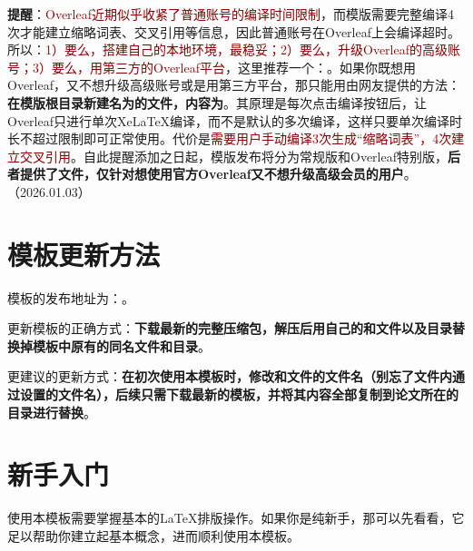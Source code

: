 \documentclass[doctor, vlined, ]{DissertUESTC}
\begin{document}
	\textbf{提醒}：\textcolor{DarkRed}{Overleaf近期似乎收紧了普通账号的编译时间限制}，而模版需要完整编译4次才能建立缩略词表、交叉引用等信息，因此普通账号在Overleaf上会编译超时。所以：\textcolor{DarkRed}{1）要么，搭建自己的本地环境，最稳妥；2）要么，升级Overleaf的高级账号；3）要么，用第三方的Overleaf平台}，这里推荐一个：\href{https://www.onlinelatex.com/home/}{\color{DarkRed}}。如果你既想用Overleaf，又不想升级高级账号或是用第三方平台，那只能用由网友\href{https://github.com/note286}{\color{DarkRed}}提供的方法：\textbf{\color{DarkRed}在模版根目录新建名为的文件，内容为}。其原理是每次点击编译按钮后，让Overleaf只进行单次XeLaTeX编译，而不是默认的多次编译，这样只要单次编译时长不超过限制即可正常使用。代价是\textcolor{DarkRed}{需要用户手动编译3次生成“缩略词表”，4次建立交叉引用}。自此提醒添加之日起，模版发布将分为常规版和Overleaf特别版，\textbf{后者提供了文件，仅针对想使用官方Overleaf又不想升级高级会员的用户}。（2026.01.03）


	\section{模板更新方法}

	模板的发布地址为：\href{https://github.com/MGG1996/DissertationUESTC}{\color{DarkRed}}。
	
	更新模板的正确方式：\textbf{下载最新的完整压缩包，解压后用自己的和文件以及目录替换掉模板中原有的同名文件和目录}。

	更建议的更新方式：\textbf{\color{DarkRed}在初次使用本模板时，修改和文件的文件名（别忘了文件内通过设置的文件名），后续只需下载最新的模板，并将其内容全部复制到论文所在的目录进行替换}。


	\section{新手入门}

	使用本模板需要掌握基本的LaTeX排版操作。如果你是纯新手，那可以先看看\href{https://ctan.math.utah.edu/ctan/tex-archive/info/lshort/chinese/lshort-zh-cn.pdf}{\bfseries\color{DarkRed}}，它足以帮助你建立起基本概念，进而顺利使用本模板。
\end{document}
